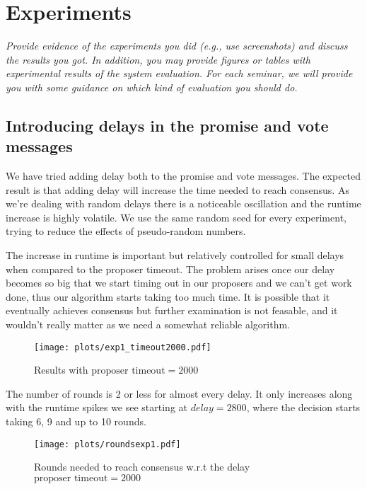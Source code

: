 \documentclass[a4paper, 10pt]{article}
\begin{document}
\section{Experiments}
\textit{Provide evidence of the experiments you did (e.g., use screenshots) and discuss the results you got. In addition, you may provide figures or tables with experimental results of the system evaluation. For each seminar, we will provide you with some guidance on which kind of evaluation you should do.}

\subsection{Introducing delays in the promise and vote messages}

We have tried adding delay both to the promise and vote messages. The expected result is 
that adding delay will increase the time needed to reach consensus. As we're dealing with
random delays there is a noticeable oscillation and the runtime increase is highly volatile.
We use the same random seed for every experiment, trying to reduce the effects of pseudo-random numbers.


The increase in runtime is important but relatively controlled for small delays when compared
to the proposer timeout. The problem arises once our delay becomes so big that we start 
timing out in our proposers and we can't get work done, thus our algorithm starts taking too
much time. It is possible that it eventually achieves consensus but further examination 
is not feasable, and it wouldn't really matter as we need a somewhat reliable algorithm. 


\begin{figure}[H]
  \centering
  \texttt{[image: plots/exp1\_timeout2000.pdf]}
    \caption{Results with $\text{proposer timeout}=2000$}
\end{figure}

The number of rounds is 2 or less for almost every delay. It only increases along with the runtime spikes we see starting at $delay=2800$, where the decision starts taking 6, 9 and up to 10 rounds.
\begin{figure}[H]
  \centering
  \texttt{[image: plots/roundsexp1.pdf]}
    \caption{Rounds needed to reach consensus w.r.t the delay\protect\footnotemark \   $\text{proposer timeout}=2000$}
\end{figure} 
\end{document}
